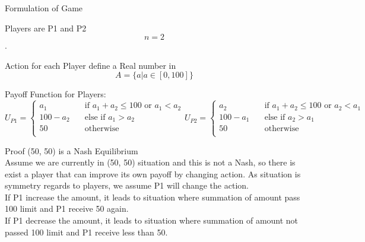 \documentclass[
  course = {{IE579 Game Theory and Multi-Agent Reinforcement Learning}},
  assignment = 1,
  name = {{Mohammad Mahdi Rahimi}},
  studentnumber = {{20208244}},
  email = {{mahi@kaist.ac.kr}},
  firstexercise = 1
]{aga-homework}
\begin{document}
\exercise
\subexercise Formulation of Game

Players are P1 and P2\[ n = 2\].

Action for each Player define a Real number in \[A = \{ a | a \in [0,100] \}\]

Payoff Function for Players:
\[ U_{P1} = 
     \begin{cases}
       a_1 &\quad\text{if }a_1 + a_2 \le 100 \text{ or } a_1 < a_2\\
       100 - a_2 &\quad\text{else if } a_1 > a_2 \\
       50 &\quad\text{otherwise}\\ 
     \end{cases}
     U_{P2} = 
     \begin{cases}
       a_2 &\quad\text{if }a_1 + a_2 \le 100 \text{ or } a_2 < a_1\\
       100 - a_1 &\quad\text{else if } a_2 > a_1 \\
       50 &\quad\text{otherwise}\\ 
     \end{cases}
\]

\subexercise Proof (50, 50) is a Nash Equilibrium
\\

Assume we are currently in (50, 50) situation and this is not a Nash, so there is exist a player that can improve its own payoff by changing action.
As situation is symmetry regards to players, we assume P1 will change the action.
\\

If P1 increase the amount, it leads to situation where summation of amount pass 100 limit and P1 receive 50 again. 
\\

If P1 decrease the amount, it leads to situation where summation of amount not passed 100 limit and P1 receive less than 50.
\\
\end{document}
